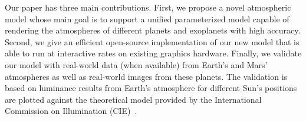 \documentclass[journal]{vgtc}                %
\newcommand{\anderscomment}[1]{\textbf{[AY~} \textcolor{cyan}{#1} \textbf{~]}}
\begin{document}
Our paper has three main contributions. First, we propose a novel atmospheric model whose main goal is to support a unified parameterized model capable of rendering the atmospheres of different planets and exoplanets with high accuracy. Second, we give an efficient open-source implementation of our new model that is able to run at interactive rates on existing graphics hardware. Finally, we validate our model with real-world data (when available) from Earth's and Mars' atmospheres as well as real-world images from these planets. The validation is based on luminance results from Earth's atmosphere for different Sun's positions are plotted against the theoretical model provided by the International Commission on Illumination (CIE)~\cite{Darula:2002}. 
\end{document}
